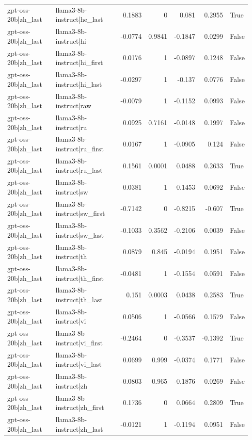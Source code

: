 \begin{table}
\begin{tabular}{l l r r r r l}
gpt-oss-20b|zh_last & llama3-8b-instruct|he_last & 0.1883 & 0 & 0.081 & 0.2955 & True \\
gpt-oss-20b|zh_last & llama3-8b-instruct|hi & -0.0774 & 0.9841 & -0.1847 & 0.0299 & False \\
gpt-oss-20b|zh_last & llama3-8b-instruct|hi_first & 0.0176 & 1 & -0.0897 & 0.1248 & False \\
gpt-oss-20b|zh_last & llama3-8b-instruct|hi_last & -0.0297 & 1 & -0.137 & 0.0776 & False \\
gpt-oss-20b|zh_last & llama3-8b-instruct|raw & -0.0079 & 1 & -0.1152 & 0.0993 & False \\
gpt-oss-20b|zh_last & llama3-8b-instruct|ru & 0.0925 & 0.7161 & -0.0148 & 0.1997 & False \\
gpt-oss-20b|zh_last & llama3-8b-instruct|ru_first & 0.0167 & 1 & -0.0905 & 0.124 & False \\
gpt-oss-20b|zh_last & llama3-8b-instruct|ru_last & 0.1561 & 0.0001 & 0.0488 & 0.2633 & True \\
gpt-oss-20b|zh_last & llama3-8b-instruct|sw & -0.0381 & 1 & -0.1453 & 0.0692 & False \\
gpt-oss-20b|zh_last & llama3-8b-instruct|sw_first & -0.7142 & 0 & -0.8215 & -0.607 & True \\
gpt-oss-20b|zh_last & llama3-8b-instruct|sw_last & -0.1033 & 0.3562 & -0.2106 & 0.0039 & False \\
gpt-oss-20b|zh_last & llama3-8b-instruct|th & 0.0879 & 0.845 & -0.0194 & 0.1951 & False \\
gpt-oss-20b|zh_last & llama3-8b-instruct|th_first & -0.0481 & 1 & -0.1554 & 0.0591 & False \\
gpt-oss-20b|zh_last & llama3-8b-instruct|th_last & 0.151 & 0.0003 & 0.0438 & 0.2583 & True \\
gpt-oss-20b|zh_last & llama3-8b-instruct|vi & 0.0506 & 1 & -0.0566 & 0.1579 & False \\
gpt-oss-20b|zh_last & llama3-8b-instruct|vi_first & -0.2464 & 0 & -0.3537 & -0.1392 & True \\
gpt-oss-20b|zh_last & llama3-8b-instruct|vi_last & 0.0699 & 0.999 & -0.0374 & 0.1771 & False \\
gpt-oss-20b|zh_last & llama3-8b-instruct|zh & -0.0803 & 0.965 & -0.1876 & 0.0269 & False \\
gpt-oss-20b|zh_last & llama3-8b-instruct|zh_first & 0.1736 & 0 & 0.0664 & 0.2809 & True \\
gpt-oss-20b|zh_last & llama3-8b-instruct|zh_last & -0.0121 & 1 & -0.1194 & 0.0951 & False \\

\end{tabular}
\end{table}
